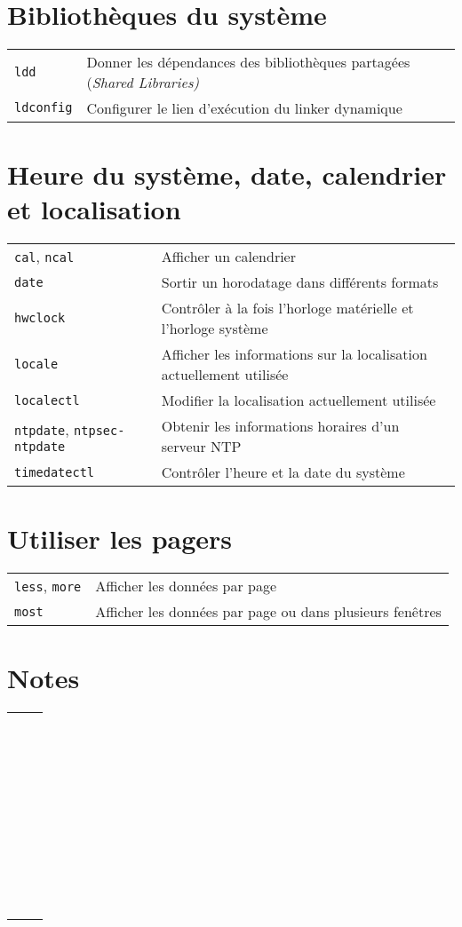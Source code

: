 \documentclass[10pt,a4paper]{article}
\begin{document}
\begin{multicols}{2}
~\hfill

\section{Bibliothèques du système}
\begin{tabular}{ p{2.5cm} p{8.5cm} }
  \hline 
  \texttt{ldd} & Donner les dépendances des bibliothèques partagées (\textit{Shared Libraries)} \\
  \texttt{ldconfig} & Configurer le lien d'exécution du linker dynamique \\
  \hline
\end{tabular}

\columnbreak

\section{Heure du système, date, calendrier et localisation}
\begin{tabular}{ p{2.75cm} p{8.25cm} }
  \hline
  \texttt{cal}, \texttt{ncal} & Afficher un calendrier\\
  \texttt{date} & Sortir un horodatage dans différents formats \\
  \texttt{hwclock} & Contrôler à la fois l'horloge matérielle et l'horloge système\\
  \texttt{locale} & Afficher les informations sur la localisation actuellement utilisée \\
  \texttt{localectl} & Modifier la localisation actuellement utilisée \\
  \texttt{ntpdate}, \texttt{ntpsec-ntpdate} & Obtenir les informations horaires d'un serveur NTP \\
  \texttt{timedatectl} & Contrôler l'heure et la date du système \\
  \hline
\end{tabular}

\section{Utiliser les pagers}
\begin{tabular}{ p{2.5cm} p{8.5cm} }
  \hline
  \texttt{less}, \texttt{more} & Afficher les données par page \\
  \texttt{most} & Afficher les données par page ou dans plusieurs fenêtres \\
  \hline
\end{tabular}
\section*{Notes}

\begin{tabular}{ p{2.5cm} p{8.5cm} }
  \hline
  ~ & \\
  ~ & \\
  ~ & \\
  ~ & \\
  ~ & \\
  ~ & \\
  ~ & \\
  ~ & \\
  \hline
\end{tabular}
\end{multicols}
\end{document}
